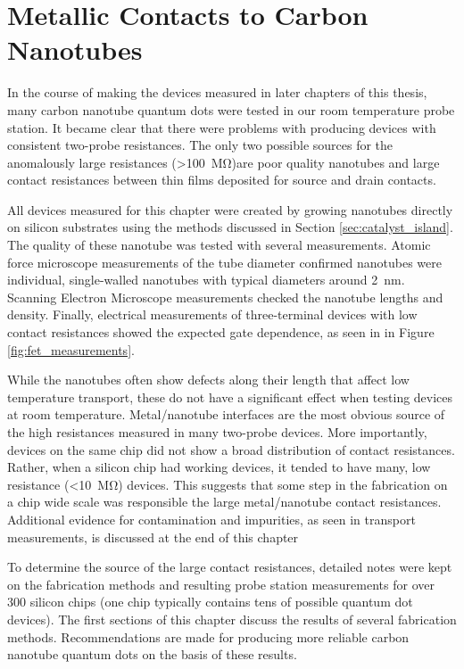 \chapter{Metallic Contacts to Carbon Nanotubes}
\label{chap:contacts}

In the course of making the devices measured in later chapters of this thesis, many carbon nanotube quantum dots were tested in our room temperature probe station. It became clear that there were problems with producing devices with consistent two-probe resistances. The only two possible sources for the anomalously large resistances (>\SI{100}{\mega\ohm})are poor quality nanotubes and large contact resistances between thin films deposited for source and drain contacts. 

All devices measured for this chapter were created by growing nanotubes directly on silicon substrates using the methods discussed in Section \ref{sec:catalyst_island}. The quality of these nanotube was tested with several measurements. Atomic force microscope measurements of the tube diameter confirmed nanotubes were individual, single-walled nanotubes with typical diameters around \SI{2}{\nano\meter}. Scanning Electron Microscope measurements checked the nanotube lengths and density. Finally, electrical measurements of three-terminal devices with low contact resistances showed the expected gate dependence, as seen in in Figure \ref{fig:fet_measurements}.

While the nanotubes often show defects along their length that affect low temperature transport, these do not have a significant effect when testing devices at room temperature.  Metal/nanotube interfaces are the most obvious source of the high resistances measured in many two-probe devices. More importantly, devices on the same chip did not show a broad distribution of contact resistances. Rather, when a silicon chip had working devices, it tended to have many, low resistance (<\SI{10}{\mega\ohm}) devices. This suggests that some step in the fabrication on a chip wide scale was responsible the large metal/nanotube contact resistances. Additional evidence for contamination and impurities, as seen in transport measurements, is discussed at the end of this chapter

To determine the source of the large contact resistances, detailed notes were kept on the fabrication methods and resulting probe station measurements for over 300 silicon chips (one chip typically contains tens of possible quantum dot devices). The first sections of this chapter discuss the results of several fabrication methods. Recommendations are made for producing more reliable carbon nanotube quantum dots on the basis of these results.

